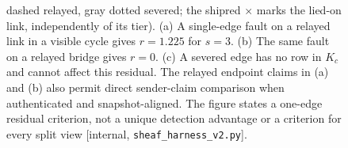 \begin{figure}[htbp]
{dashed relayed, gray dotted severed; the shipred $\times$ marks the lied-on link, independently of its tier).
(a) A single-edge fault on a relayed link in a visible cycle gives $r=1.225$ for $s=3$. (b) The same fault on a
relayed bridge gives $r=0$. (c) A severed edge has no row in $K_c$ and cannot affect this residual.
The relayed endpoint claims in (a) and (b) also permit direct sender-claim comparison when authenticated and
snapshot-aligned. The figure states a one-edge residual criterion, not a unique detection advantage or a criterion
for every split view [internal, \texttt{sheaf\_harness\_v2.py}].}
\label{fig:r6reg}
\end{figure}
